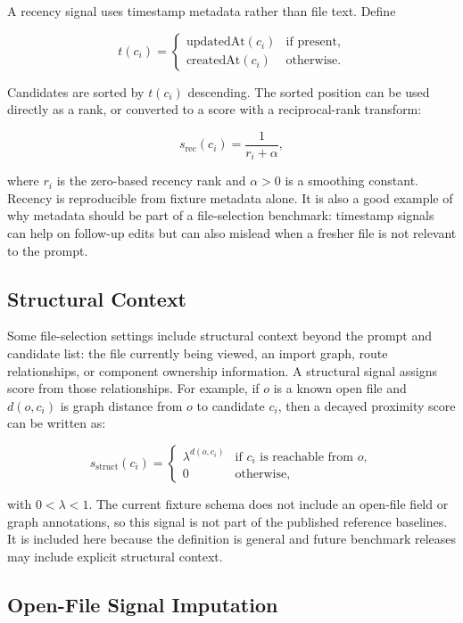 \documentclass[11pt,a4paper]{article}
\begin{document}
A recency signal uses timestamp metadata rather than file text. Define

\[
t(c_i) =
\begin{cases}
\mathrm{updatedAt}(c_i) & \text{if present},\\
\mathrm{createdAt}(c_i) & \text{otherwise.}
\end{cases}
\]

Candidates are sorted by $t(c_i)$ descending. The sorted position can be used
directly as a rank, or converted to a score with a reciprocal-rank transform:

\[
s_{\mathrm{rec}}(c_i) = \frac{1}{r_i + \alpha},
\]

where $r_i$ is the zero-based recency rank and $\alpha > 0$ is a smoothing
constant. Recency is reproducible from fixture metadata alone. It is also a good
example of why metadata should be part of a file-selection benchmark: timestamp
signals can help on follow-up edits but can also mislead when a fresher file is
not relevant to the prompt.

\subsection{Structural Context}

Some file-selection settings include structural context beyond the prompt and
candidate list: the file currently being viewed, an import graph, route
relationships, or component ownership information. A structural signal assigns
score from those relationships. For example, if $o$ is a known open file and
$d(o,c_i)$ is graph distance from $o$ to candidate $c_i$, then a decayed
proximity score can be written as:

\[
s_{\mathrm{struct}}(c_i) =
\begin{cases}
\lambda^{d(o,c_i)} & \text{if } c_i \text{ is reachable from } o,\\
0 & \text{otherwise,}
\end{cases}
\]

with $0 < \lambda < 1$. The current fixture schema does not include an open-file
field or graph annotations, so this signal is not part of the published
reference baselines. It is included here because the definition is general and
future benchmark releases may include explicit structural context.

\subsection{Open-File Signal Imputation}
\end{document}
